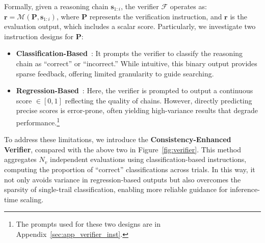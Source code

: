 Formally, given a reasoning chain \(\mathbf{s}_{1:i}\), the verifier \(\mathcal{F}\) operates as:  
\(\mathbf{r} = \mathcal{M}(\mathbf{P}, \mathbf{s}_{1:i})\),
where \(\mathbf{P}\) represents the verification instruction, and \(\mathbf{r}\) is the evaluation output, which includes a scalar score.
Particularly, we investigate two instruction designs for \(\mathbf{P}\): 
\begin{itemize}[leftmargin=*]
    \item \textbf{Classification-Based}~\cite{binary1, gen-verifier,  binary2}: It prompts the verifier to classify the reasoning chain as ``correct'' or ``incorrect.'' While intuitive, this binary output provides sparse feedback, offering limited granularity to guide searching. 
    \item \textbf{Regression-Based}~\cite{scoring1, llava-critic}: Here, the verifier is prompted to output a continuous score \(\in [0, 1]\) reflecting the quality of chains. However, directly predicting precise scores is error-prone, often yielding high-variance results that degrade performance.\footnote{The prompts used for these two designs are in Appendix~\ref{sec:app_verifier_inst}.}
\end{itemize}

To address these limitations, we introduce the \textbf{Consistency-Enhanced Verifier}, compared with the above two in Figure~\ref{fig:verifier}.
This method aggregates $N_{v}$ independent evaluations using classification-based instructions, computing the proportion of ``correct'' classifications across trials. 
In this way, it not only avoids variance in regression-based outputs but also overcomes the sparsity of single-trail classification, enabling more reliable guidance for inference-time scaling.








